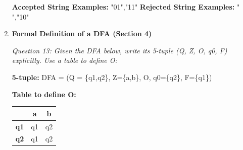 \documentclass[10pt,letterpaper,unboxed,cm]{article}
\begin{document}
\begin{enumerate}
\textbf{Accepted String Examples: }"01","11" \newline
\textbf{Rejected String Examples: }" ","10" \newline

\pagebreak

\item \textbf{Formal Definition of a DFA (Section 4)} \newline

\emph{Question 13: Given the DFA below, write its 5-tuple (Q, Z, O, q0, F) explicitly. Use a table to define O:} \newline

\textbf{5-tuple:} DFA = (Q = \{q1,q2\}, Z=\{a,b\}, O, q0=\{q2\}, F=\{q1\}) \newline 

\textbf{Table to define O: }
\begin{center}
    \begin{tabular}{||c || c c||} 
     \hline
         & \textbf{a} & \textbf{b}\\ [0.5ex] 
     \hline\hline
     \textbf{q1} & q1 & q2\\ 
     \hline
     \textbf{q2} & q1 & q2 \\
    \end{tabular}
    \end{center}
\end{enumerate}
\end{document}
